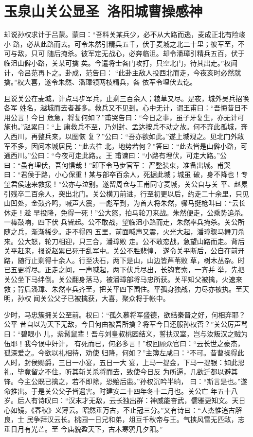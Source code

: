 \chapter{玉泉山关公显圣~洛阳城曹操感神}

却说孙权求计于吕蒙。蒙曰：“吾料关某兵少，必不从大路而逃，麦成正北有险峻小
路，必从此路而去。可令朱然引精兵五千，伏于麦城之北二十里；彼军至，不可与敌，只可
随后掩杀。彼军定无战心，必奔临沮。却令潘璋引精兵五百，伏于临沮山僻小路，关某可擒
矣。今遣将士各门攻打，只空北门，待其出走。”权闻计，令吕范再卜之。卦成，范告曰：
“此卦主敌人投西北而走，今夜亥时必然就擒。”权大喜，遂令朱然、潘璋领两枝精兵，各
依军令埋伏去讫。

且说关公在麦城，计点马步军兵，止剩三百余人；粮草又尽。是夜，城外吴兵招唤各军
姓名，越城而去者甚多。救兵又不见到。心中无计，谓王甫曰：“吾悔昔日不用公言！今日
危急，将复何如？”甫哭告曰：“今日之事，虽子牙复生，亦无计可施也。”赵累曰：“上
庸救兵不至，乃刘封、孟达按兵不动之故。何不弃此孤城，奔入西川，再整兵来，以图恢
复？”公曰：“吾亦欲如此。”遂上城观之。见北门外敌军不多，因问本城居民：“此去往
北，地势若何？”答曰：“此去皆是山僻小路，可通西川。”公曰：“今夜可走此路。。王
甫谏曰：“小路有埋伏，可走大路。”公曰：“虽有埋伏，吾何惧哉！”即下令马步官军：
严整装束，准备出城。甫哭曰：“君侯于路，小心保重！某与部卒百余人，死据此城；城虽
破，身不降也！专望君侯速来救援！”公亦与泣别。遂留周仓与王甫同守麦城，关公自与关
平、赵累引残卒二百余人，突出北门。关公横刀前进，行至初更以后，约走二十余里，只见
山凹处，金鼓齐鸣，喊声大震，一彪军到，为首大将朱然，骤马挺枪叫曰：“云长休走！趁
早投降，免得一死！”公大怒，拍马轮刀来战。朱然便走，公乘势追杀。一棒鼓响，四下伏
兵皆起。公不敢战，望临沮小路而走，朱然率兵掩杀。关公所随之兵，渐渐稀少。走不得四
五里，前面喊声又震，火光大起，潘璋骤马舞刀杀来。公大怒，轮刀相迎，只三合，潘璋败
走。公不敢恋战，急望山路而走。背后关平赶来，报说赵累已死于乱军中。关公不胜悲惶，
遂令关平断后，公自在前开路，随行止剩得十余人。行至决石，两下是山，山边皆芦苇败
草，树木丛杂。时已五更将尽。正走之间，一声喊起，两下伏兵尽出，长钩套索，一齐并
举，先把关公坐下马绊倒。关公翻身落马，被潘璋部将马忠所获。关平知父被擒，火速来
救；背后潘璋、朱然率兵齐至，把关平四下围住。平孤身独战，力尽亦被执。至天明，孙权
闻关公父子已被擒获，大喜，聚众将于帐中。

少时，马忠簇拥关公至前。权曰：“孤久慕将军盛德，欲结秦晋之好，何相弃耶？公平
昔自以为天下无敌，今日何由被吾所擒？将军今日还服孙权否？”关公厉声骂曰：“碧眼小
儿，紫髯鼠辈！吾与刘皇叔桃园结义，誓扶汉室，岂与汝叛汉之贼为伍耶！我今误中奸计，
有死而已，何必多言！”权回顾众官曰：“云长世之豪杰，孤深爱之。今欲以礼相待，劝使
归降，何如？”主簿左咸曰：“不可。昔曹操得此人时，封侯赐爵，三日一小宴，五日一大
宴，上马一提金，下马一提银：如此恩礼，毕竟留之不住，听其斩关杀将而去，致使今日反
为所逼，几欲迁都以避其锋。今主公既已擒之，若不即除，恐贻后患。”孙权沉吟半晌，
曰：“斯言是也。”遂命推出。于是关公父子皆遇害。时建安二十四年冬十二月也。关公亡
年五十八岁。后人有诗叹曰：“汉末才无敌，云长独出群：神威能奋武，儒雅更知文。天日
心如镜，《春秋》义薄云。昭然垂万古，不止冠三分。”又有诗曰：“人杰惟追古解良，士
民争拜汉云长。桃园一日兄和弟，俎豆千秋帝与王。气挟风雷无匹敌，志垂日月有光芒。至
今庙貌盈天下，古木寒鸦几夕阳。”

